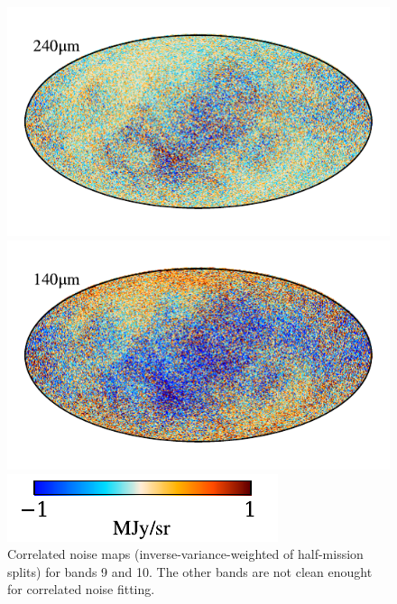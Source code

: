 \documentclass{aa}
\begin{document}
\begin{figure}
	\centering
	\includegraphics{figs/ncorr_10_c0001_000019.pdf}
  \vspace{-1cm}
  
	\includegraphics{figs/ncorr_09_c0001_000019.pdf}
  \vspace{-0.2cm}
  
	\includegraphics[width=0.5\columnwidth]{figs/ncorr_cbar_c0001_000019.pdf}

	\caption{Correlated noise maps (inverse-variance-weighted of half-mission splits) for bands 9 and 10. The other bands are not clean enought for correlated noise fitting.}
	\label{fig:ncorr}
\end{figure}
\end{document}
